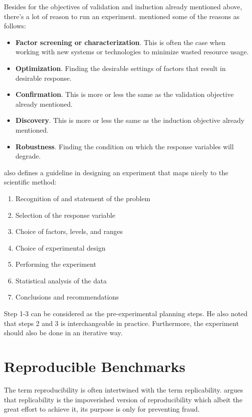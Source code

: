 Besides for the objectives of validation and induction already mentioned above, there's a lot of reason to run an experiment.
\citet{montgomeryDesignAnalysisExperiments2013} mentioned some of the reasons as follows:
\begin {itemize}
	\item \textbf{Factor screening or characterization}. This is often the case when working with new systems or technologies to minimize wasted resource usage.
	\item \textbf{Optimization}. Finding the desirable settings of factors that result in desirable response.
	\item \textbf{Confirmation}. This is more or less the same as the validation objective already mentioned.
	\item \textbf{Discovery}. This is more or less the same as the induction objective already mentioned.
	\item \textbf{Robustness}. Finding the condition on which the response variables will degrade.
\end{itemize}

\citet{montgomeryDesignAnalysisExperiments2013} also defines a guideline in designing an experiment that maps nicely to the scientific method:

\begin{enumerate}[noitemsep]
	\item Recognition of and statement of the problem
	\item Selection of the response variable
	\item Choice of factors, levels, and ranges
	\item Choice of experimental design
	\item Performing the experiment
	\item Statistical analysis of the data
	\item Conclusions and recommendations
\end{enumerate}

Step 1-3 can be considered as the pre-experimental planning steps.
He also noted that steps 2 and 3 is interchangeable in practice.
Furthermore, the experiment should also be done in an iterative way.

\section{Reproducible Benchmarks}

The term reproducibility is often intertwined with the term replicability.
\citet{drummondReplicabilityNotReproducibility2009} argues that replicability is the impoverished version of reproducibility which albeit the great effort to achieve it, its purpose is only for preventing fraud.

